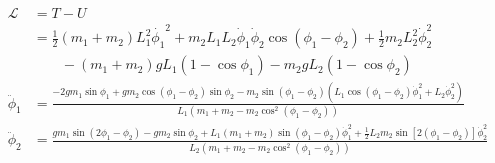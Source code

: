 \documentclass{article}
\begin{document}
\setcounter{subsection}{14}
\subsection{}

\begin{align*}
  \mathcal{L}   & = T - U                                                                                                                                                                                                                             \\
                & = \frac{1}{2} (m_1 + m_2) L_1^2 \dot{\phi_1}^2 + m_2 L_1 L_2 \dot{\phi}_1 \dot{\phi}_2 \cos (\phi_1 - \phi_2) + \frac{1}{2} m_2 L_2^2 \dot{\phi}_2^2                                                                                \\
                & \qquad - (m_1 + m_2) g L_1 (1 - \cos \phi_1) - m_2 g L_2 (1 - \cos \phi_2)                                                                                                                                                          \\
  \ddot{\phi}_1 & = \frac{-2 g m_1 \sin \phi_1 + g m_2 \cos (\phi_1 - \phi_2) \sin \phi_2 - m_2 \sin (\phi_1 - \phi_2) (L_1 \cos (\phi_1 - \phi_2) \dot{\phi}_1^2 + L_2 \dot{\phi}_2^2)}{L_1 (m_1 + m_2 - m_2 \cos^2 (\phi_1 - \phi_2))}              \\
  \ddot{\phi}_2 & = \frac{g m_1 \sin (2 \phi_1 - \phi_2) - g m_2 \sin \phi_2 + L_1 (m_1 + m_2) \sin (\phi_1 - \phi_2) \dot{\phi}_1^2 + \frac{1}{2} L_2 m_2 \sin [2 (\phi_1 - \phi_2)] \dot{\phi}_2^2}{L_2 (m_1 + m_2 - m_2 \cos^2 (\phi_1 - \phi_2))}
\end{align*}

\setcounter{subsection}{16}
\subsection{}
\end{document}
